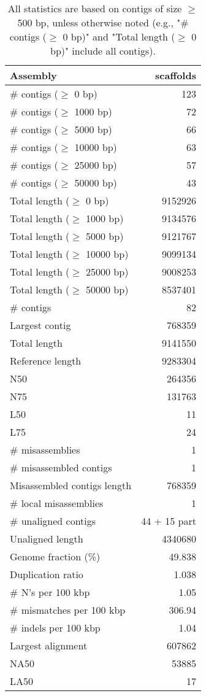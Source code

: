\documentclass[12pt,a4paper]{article}
\begin{document}
\begin{table}[ht]
\begin{center}
\caption{All statistics are based on contigs of size $\geq$ 500 bp, unless otherwise noted (e.g., "\# contigs ($\geq$ 0 bp)" and "Total length ($\geq$ 0 bp)" include all contigs).}
\begin{tabular}{|l*{1}{|r}|}
\hline
Assembly & scaffolds \\ \hline
\# contigs ($\geq$ 0 bp) & 123 \\ \hline
\# contigs ($\geq$ 1000 bp) & 72 \\ \hline
\# contigs ($\geq$ 5000 bp) & 66 \\ \hline
\# contigs ($\geq$ 10000 bp) & 63 \\ \hline
\# contigs ($\geq$ 25000 bp) & 57 \\ \hline
\# contigs ($\geq$ 50000 bp) & 43 \\ \hline
Total length ($\geq$ 0 bp) & 9152926 \\ \hline
Total length ($\geq$ 1000 bp) & 9134576 \\ \hline
Total length ($\geq$ 5000 bp) & 9121767 \\ \hline
Total length ($\geq$ 10000 bp) & 9099134 \\ \hline
Total length ($\geq$ 25000 bp) & 9008253 \\ \hline
Total length ($\geq$ 50000 bp) & 8537401 \\ \hline
\# contigs & 82 \\ \hline
Largest contig & 768359 \\ \hline
Total length & 9141550 \\ \hline
Reference length & 9283304 \\ \hline
N50 & 264356 \\ \hline
N75 & 131763 \\ \hline
L50 & 11 \\ \hline
L75 & 24 \\ \hline
\# misassemblies & 1 \\ \hline
\# misassembled contigs & 1 \\ \hline
Misassembled contigs length & 768359 \\ \hline
\# local misassemblies & 1 \\ \hline
\# unaligned contigs & 44 + 15 part \\ \hline
Unaligned length & 4340680 \\ \hline
Genome fraction (\%) & 49.838 \\ \hline
Duplication ratio & 1.038 \\ \hline
\# N's per 100 kbp & 1.05 \\ \hline
\# mismatches per 100 kbp & 306.94 \\ \hline
\# indels per 100 kbp & 1.04 \\ \hline
Largest alignment & 607862 \\ \hline
NA50 & 53885 \\ \hline
LA50 & 17 \\ \hline
\end{tabular}
\end{center}
\end{table}
\end{document}

